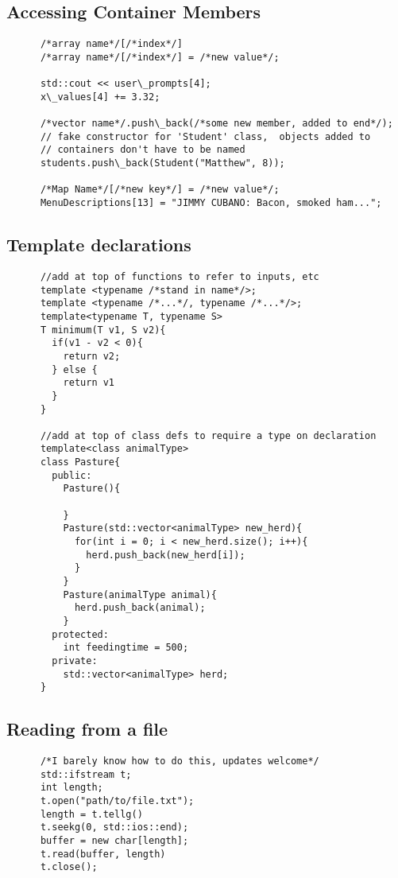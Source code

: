 \documentclass[12pt]{article}
\begin{document}
  \subsection{Accessing Container Members}
    \begin{lstlisting}
      /*array name*/[/*index*/]
      /*array name*/[/*index*/] = /*new value*/;

      std::cout << user\_prompts[4];
      x\_values[4] += 3.32;

      /*vector name*/.push\_back(/*some new member, added to end*/);
      // fake constructor for 'Student' class,  objects added to
      // containers don't have to be named
      students.push\_back(Student("Matthew", 8)); 

      /*Map Name*/[/*new key*/] = /*new value*/;
      MenuDescriptions[13] = "JIMMY CUBANO: Bacon, smoked ham...";
   \end{lstlisting} 
  \subsection{Template declarations}
    \begin{lstlisting}
      //add at top of functions to refer to inputs, etc
      template <typename /*stand in name*/>;
      template <typename /*...*/, typename /*...*/>;
      template<typename T, typename S>
      T minimum(T v1, S v2){
        if(v1 - v2 < 0){
          return v2;
        } else {
          return v1
        }
      }

      //add at top of class defs to require a type on declaration
      template<class animalType>
      class Pasture{
        public:
          Pasture(){
          
          }
          Pasture(std::vector<animalType> new_herd){
            for(int i = 0; i < new_herd.size(); i++){
              herd.push_back(new_herd[i]);
            }
          }
          Pasture(animalType animal){
            herd.push_back(animal);
          }
        protected:
          int feedingtime = 500;
        private:
          std::vector<animalType> herd;
      }

    \end{lstlisting}
  \subsection{Reading from a file}
    \begin{lstlisting}
      /*I barely know how to do this, updates welcome*/
      std::ifstream t;
      int length;
      t.open("path/to/file.txt");
      length = t.tellg()
      t.seekg(0, std::ios::end);
      buffer = new char[length];
      t.read(buffer, length)
      t.close();
    \end{lstlisting}
\end{document}
